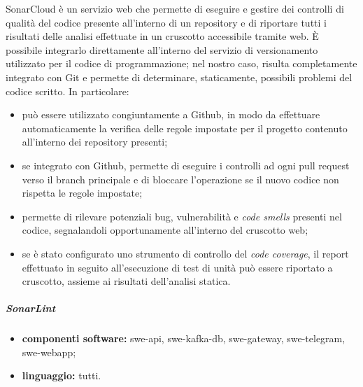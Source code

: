 					SonarCloud è un servizio web che permette di eseguire e gestire dei controlli di qualità del codice presente all'interno di un repository e di riportare tutti i risultati delle analisi effettuate in un cruscotto accessibile tramite web.
					\newline
					È possibile integrarlo direttamente all'interno del servizio di versionamento utilizzato per il codice di programmazione; nel nostro caso, risulta completamente integrato con Git e permette di determinare, staticamente, possibili problemi del codice scritto. In particolare:
					\begin{itemize}
						\item può essere utilizzato congiuntamente a Github, in modo da effettuare automaticamente la verifica delle regole impostate per il progetto contenuto all'interno dei repository presenti;
						\item se integrato con Github, permette di eseguire i controlli ad ogni pull request verso il branch principale e di bloccare l'operazione se il nuovo codice non rispetta le regole impostate; 
						\item permette di rilevare potenziali bug, vulnerabilità e \textit{code smells} presenti nel codice, segnalandoli opportunamente all'interno del cruscotto web;
						\item se è stato configurato uno strumento di controllo del \textit{code coverage}, il report effettuato in seguito all'esecuzione di test di unità può essere riportato a cruscotto, assieme ai risultati dell'analisi statica.
					\end{itemize}

                \subparagraph{SonarLint}

	                \begin{itemize}
	                    \item \textbf{componenti software:} swe-api, swe-kafka-db, swe-gateway, swe-telegram, swe-webapp;
	                    \item \textbf{linguaggio:} tutti.
	                \end{itemize}
	
